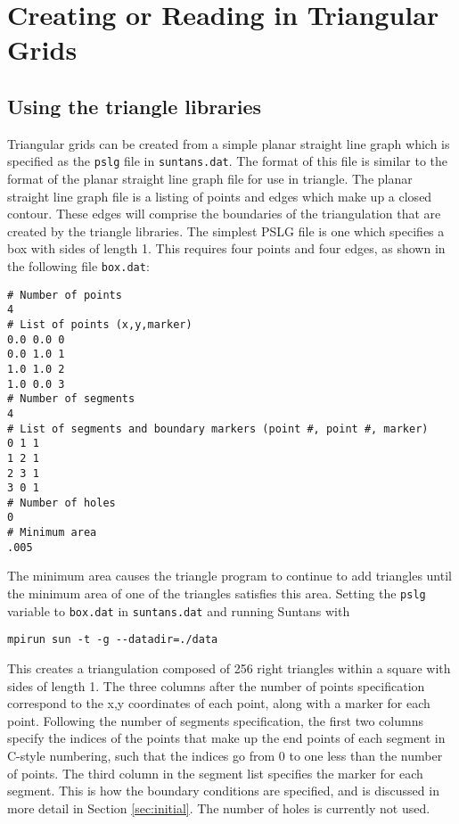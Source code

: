 \documentclass[12pt,oneside]{article}
\begin{document}
\section{Creating or Reading in Triangular Grids} \label{sec:grids}

\subsection{Using the triangle libraries}

Triangular grids can be created from a simple planar straight line
graph which is specified as the \verb+pslg+ file in \verb+suntans.dat+.
The format of this file is similar to the format of the planar straight
line graph file for use in triangle.  The planar straight line graph
file is a listing of points and edges which make up a closed contour.
These edges will comprise the boundaries of the triangulation that are
created by the triangle libraries.  The simplest PSLG file is one which
specifies a box with sides of length 1.  This requires four points and
four edges, as shown in the following file \verb+box.dat+:
\begin{verbatim}
# Number of points
4
# List of points (x,y,marker)
0.0 0.0 0
0.0 1.0 1
1.0 1.0 2
1.0 0.0 3
# Number of segments
4
# List of segments and boundary markers (point #, point #, marker)
0 1 1
1 2 1
2 3 1
3 0 1
# Number of holes
0
# Minimum area
.005
\end{verbatim}
The minimum area causes the triangle program to continue to add triangles
until the minimum area of one of the triangles satisfies this area.  
Setting the \verb+pslg+ variable to \verb+box.dat+ in \verb+suntans.dat+
and running Suntans with
\begin{verbatim}
mpirun sun -t -g --datadir=./data
\end{verbatim}
This creates a triangulation composed of 256 right triangles within a square
with sides of length 1.  The three columns after the number of points
specification correspond to the x,y coordinates of each point, along
with a marker for each point.  Following the number of segments specification,
the first two columns specify the indices of the points that make up
the end points of each segment in C-style numbering, such that the indices
go from 0 to one less than the number of points.  The third column in the
segment list specifies the marker for each segment.  This is how the boundary
conditions are specified, and is discussed in more detail in Section \ref{sec:initial}.
The number of holes is currently not used.
\end{document}
